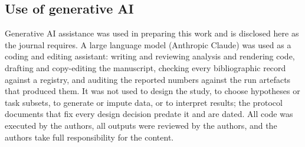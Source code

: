 \subsection{Use of generative AI}
\label{sec:genai}

Generative AI assistance was used in preparing this work and is disclosed here as the journal
requires. A large language model (Anthropic Claude) was used as a coding and editing assistant:
writing and reviewing analysis and rendering code, drafting and copy-editing the manuscript,
checking every bibliographic record against a registry, and auditing the reported numbers against
the run artefacts that produced them. It was not used to design the study, to choose hypotheses or
task subsets, to generate or impute data, or to interpret results; the protocol documents that fix
every design decision predate it and are dated. All code was executed by the authors, all outputs
were reviewed by the authors, and the authors take full responsibility for the content.


